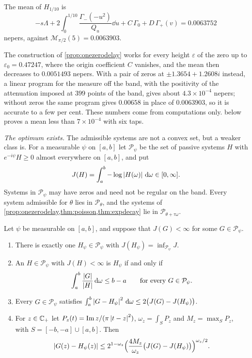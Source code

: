 The mean of $H_{1/10}$ is
\[
-s\Lambda+2\int_0^{1/10}\frac{\Gamma_-(-u^2)}{Q_u}\dd u+C\,\Gamma_0+D\,\Gamma_+(v)
=0.0063752
\]
nepers, against $\mathcal M_{\pi/2}(5)=0.0063903$.

\begin{remark}\label{rem:onezerofamily}
The construction of \cref{prop:onezerodelay} works for every height
$\varepsilon$ of the zero up to $\varepsilon_0=0.47247$, where the origin
coefficient $C$ vanishes, and the mean then decreases to $0.0051493$ nepers.
With a pair of zeros at $\pm1.3654+1.2608i$ instead, a linear program for
the measure off the band, with the positivity of the attenuation imposed at
$399$ points of the band, gives about $4.3\times10^{-4}$ nepers; without zeros
the same program gives $0.00658$ in place of $0.0063903$, so it is accurate to
a few per cent. These numbers come from computations only.  below proves a mean less than
$7\times10^{-4}$ with six taps.
\end{remark}

\emph{The optimum exists.} The admissible systems are not a convex set, but
a weaker class is. For a measurable $\psi$ on $[a,b]$ let $\mathcal P_\psi$ be
the set of passive systems $H$ with $e^{-i\psi}H\ge0$ almost everywhere on
$[a,b]$, and put
\[
J(H)=\int_a^b-\log\left|H(\omega)\right|\,\mathrm d\omega\in[0,\infty] .
\]
Systems in $\mathcal P_\psi$ may have zeros and need not be regular on the
band. Every system admissible for $\theta$ lies in $\mathcal P_\theta$, and the
systems of \cref{prop:onezerodelay,thm:poisson,thm:expdecay} lie in
$\mathcal P_{\theta+\tau\omega}$.

\begin{theorem}\label{thm:convex}
Let $\psi$ be measurable on $[a,b]$, and suppose that $J(G)<\infty$ for some
$G\in\mathcal P_\psi$.
\begin{enumerate}
\item[(i)] There is exactly one $H_\psi\in\mathcal P_\psi$ with
$J(H_\psi)=\inf_{\mathcal P_\psi}J$.
\item[(ii)] An $H\in\mathcal P_\psi$ with $J(H)<\infty$ is $H_\psi$ if and only if
\[
\int_a^b\frac{\left|G\right|}{\left|H\right|}\,\mathrm d\omega\le b-a\qquad\text{for every }G\in\mathcal P_\psi .
\]
\item[(iii)] Every $G\in\mathcal P_\psi$ satisfies
$\int_a^b\left|G-H_\psi\right|^2\,\mathrm d\omega\le2\big(J(G)-J(H_\psi)\big)$.
\item[(iv)] For $z\in\mathbb C_{+}$ let $P_z(t)=\operatorname{Im} z/(\pi\left|t-z\right|^2)$,
$\omega_z=\int_SP_z$ and $M_z=\max_SP_z$, with $S=[-b,-a]\cup[a,b]$. Then
\[
\left|G(z)-H_\psi(z)\right|\le2^{1-\omega_z}\Big(\frac{4M_z}{\omega_z}\big(J(G)-J(H_\psi)\big)\Big)^{\omega_z/2}.
\]
\end{enumerate}
\end{theorem}

